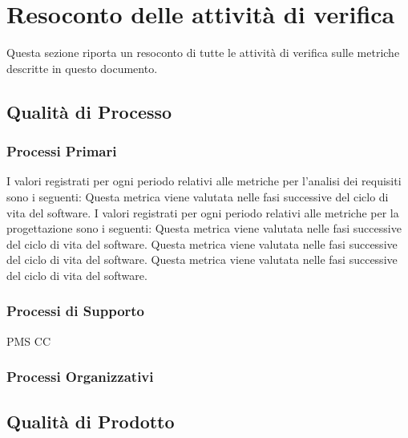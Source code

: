 \section{Resoconto delle attività di verifica}
	Questa sezione riporta un resoconto di tutte le attività di verifica sulle metriche descritte in questo documento.

	\subsection{Qualità di Processo}
		\subsubsection{Processi Primari}
			I valori registrati per ogni periodo relativi alle metriche per l'analisi dei requisiti sono i seguenti:
				Questa metrica viene valutata nelle fasi successive del ciclo di vita del software.
			I valori registrati per ogni periodo relativi alle metriche per la progettazione sono i seguenti:
				Questa metrica viene valutata nelle fasi successive del ciclo di vita del software.
				Questa metrica viene valutata nelle fasi successive del ciclo di vita del software.
				Questa metrica viene valutata nelle fasi successive del ciclo di vita del software.
				 
			
		\subsubsection{Processi di Supporto}
				
				PMS		%
				CC	%
				
		\subsubsection{Processi Organizzativi}
			
	\subsection{Qualità di Prodotto}
